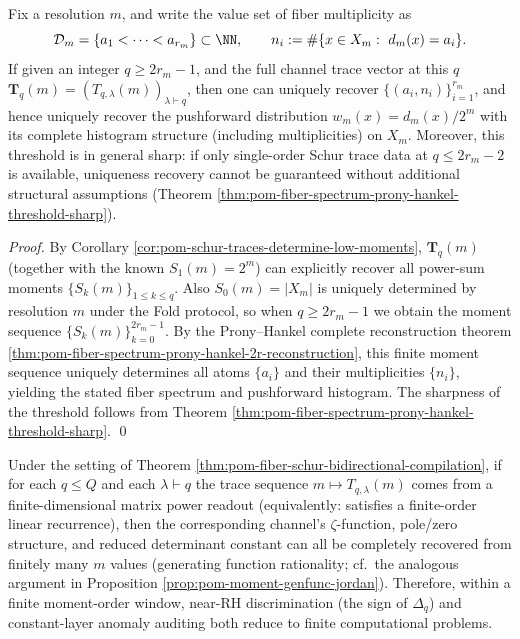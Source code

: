 \begin{theorem}\label{thm:pom-single-q-schur-traces-complete-fiber-spectrum}
Fix a resolution \(m\), and write the value set of fiber multiplicity as
\[
\mathcal{D}_m=\{a_1<\cdots<a_{r_m}\}\subset\NN,
\qquad
n_i:=\#\{x\in X_m:\ d_m(x)=a_i\}.
\]
If given an integer \(q\ge 2r_m-1\), and the full channel trace vector at this \(q\)
\(
\mathbf T_q(m)=(T_{q,\lambda}(m))_{\lambda\vdash q}
\),
then one can uniquely recover \(\{(a_i,n_i)\}_{i=1}^{r_m}\), and hence uniquely recover the pushforward distribution
\(
w_m(x)=d_m(x)/2^m
\)
with its complete histogram structure (including multiplicities) on \(X_m\).
Moreover, this threshold is in general sharp: if only single-order Schur trace data at \(q\le 2r_m-2\) is available, uniqueness recovery cannot be guaranteed without additional structural assumptions (Theorem \ref{thm:pom-fiber-spectrum-prony-hankel-threshold-sharp}).
\end{theorem}
\begin{proof}
By Corollary \ref{cor:pom-schur-traces-determine-low-moments}, \(\mathbf T_q(m)\) (together with the known \(S_1(m)=2^m\)) can explicitly recover all power-sum moments \(\{S_k(m)\}_{1\le k\le q}\).
Also \(S_0(m)=|X_m|\) is uniquely determined by resolution \(m\) under the Fold protocol, so when \(q\ge 2r_m-1\) we obtain the moment sequence \(\{S_k(m)\}_{k=0}^{2r_m-1}\).
By the Prony--Hankel complete reconstruction theorem \ref{thm:pom-fiber-spectrum-prony-hankel-2r-reconstruction}, this finite moment sequence uniquely determines all atoms \(\{a_i\}\) and their multiplicities \(\{n_i\}\), yielding the stated fiber spectrum and pushforward histogram.
The sharpness of the threshold follows from Theorem \ref{thm:pom-fiber-spectrum-prony-hankel-threshold-sharp}. \qed
\end{proof}

\begin{corollary}\label{cor:pom-finite-q-window-decidable-full-audit}
Under the setting of Theorem \ref{thm:pom-fiber-schur-bidirectional-compilation}, if for each \(q\le Q\) and each \(\lambda\vdash q\) the trace sequence \(m\mapsto T_{q,\lambda}(m)\) comes from a finite-dimensional matrix power readout (equivalently: satisfies a finite-order linear recurrence),
then the corresponding channel's \(\zeta\)-function, pole/zero structure, and reduced determinant constant can all be completely recovered from finitely many \(m\) values (generating function rationality; cf.\ the analogous argument in Proposition \ref{prop:pom-moment-genfunc-jordan}).
Therefore, within a finite moment-order window, near-RH discrimination (the sign of \(\Delta_q\)) and constant-layer anomaly auditing both reduce to finite computational problems.
\end{corollary}

